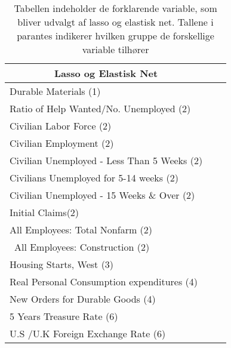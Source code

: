  \begin{table}
\small
\center
\begin{tabular}{lcc}
\toprule
\multicolumn{1}{c}{Lasso og Elastisk Net}  \\ \midrule
Durable Materials (1)    \\
Ratio of Help Wanted/No. Unemployed (2) \\
Civilian Labor Force (2)   \\
Civilian Employment  (2)  \\
Civilian Unemployed - Less Than 5 Weeks (2)   \\
Civilians Unemployed for 5-14 weeks (2)  \\
Civilian Unemployed - 15 Weeks \& Over (2)  \\
Initial Claims(2)   \\ 
All Employees: Total Nonfarm (2)  \\\
All Employees: Construction (2)  \\
Housing Starts, West (3) \\
Real Personal Consumption expenditures (4) \\
New Orders for Durable Goods (4)  \\
5 Years Treasure Rate (6)  \\
U.S /U.K Foreign Exchange Rate  (6) \\  \bottomrule 
\end{tabular}
\caption{Tabellen indeholder de forklarende variable, som bliver udvalgt af lasso og elastisk net. Tallene i parantes indikerer hvilken gruppe de forskellige variable tilhører} \label{tab: lasso_ud}
\end{table}

